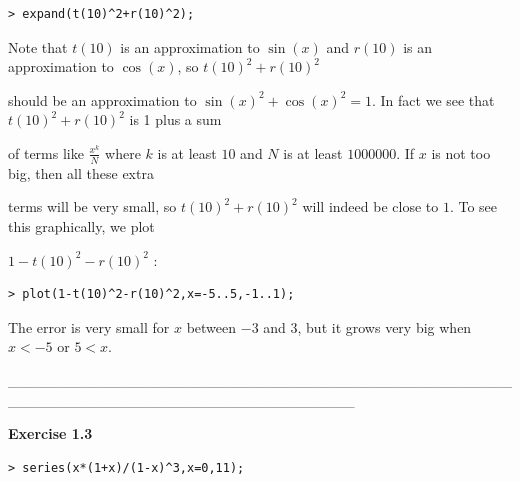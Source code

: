 \documentclass{article}
\begin{document}
\begin{lstlisting}
> expand(t(10)^2+r(10)^2);
\end{lstlisting}
\begin{Maple Normal}

\end{Maple Normal}
\begin{Maple Normal}
Note that 
$t (10)$ is an approximation to 
$\sin (x)$ and 
$r (10)$ is an approximation to 
$\cos (x)$, so 
$t (10)^{2}+r (10)^{2}$
\end{Maple Normal}
\begin{Maple Normal}
should be an approximation to 
$\sin (x)^{2}+\cos (x)^{2}=1$.  In fact we see that  
$t (10)^{2}+r (10)^{2}$ is 1 plus a sum
\end{Maple Normal}
\begin{Maple Normal}
of terms like 
$\frac{x^{k}}{N}$ where 
$k$ is at least 
$10$ and 
$N$ is at least 
$1000000$.  If 
$x$ is not too big, then all these extra 
\end{Maple Normal}
\begin{Maple Normal}
terms will be very small, so 
$t (10)^{2}+r (10)^{2}$ will indeed be close to 
$1$.  To see this graphically, we plot
\end{Maple Normal}
\begin{Maple Normal}

$1-t (10)^{2}-r (10)^{2}$ :
\end{Maple Normal}
\begin{lstlisting}
> plot(1-t(10)^2-r(10)^2,x=-5..5,-1..1);
\end{lstlisting}
\begin{Maple Normal}
The error is very small for 
$x$ between 
$-3$ and 
$3$, but it grows very big when 
$x <-5$ or 
$5<x$.
\end{Maple Normal}
\begin{Maple Normal}
\_\_\_\_\_\_\_\_\_\_\_\_\_\_\_\_\_\_\_\_\_\_\_\_\_\_\_\_\_\_\_\_\_\_\_\_\_\_\_\_\_\_\_\_\_\_\_\_\_\_\_\_\_\_\_\_\_\_\_\_\_\_\_\_\_\_\_\_\_\_\_\_\_\_\_\_\_\_\_\_\_
\end{Maple Normal}
\begin{Maple Heading 2}
\textbf{Exercise 1.3}
\end{Maple Heading 2}
\begin{lstlisting}
> series(x*(1+x)/(1-x)^3,x=0,11);
\end{lstlisting}
\begin{Maple Normal}

\end{Maple Normal}
\end{document}
